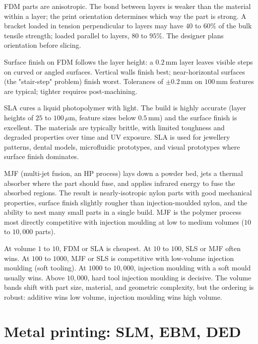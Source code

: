 FDM parts are anisotropic. The bond between layers is weaker than the material within a layer; the print orientation determines which way the part is strong. A bracket loaded in tension perpendicular to layers may have $40$ to $60\%$ of the bulk tensile strength; loaded parallel to layers, $80$ to $95\%$. The designer plans orientation before slicing.

Surface finish on FDM follows the layer height: a $0.2\,\text{mm}$ layer leaves visible steps on curved or angled surfaces. Vertical walls finish best; near-horizontal surfaces (the "stair-step" problem) finish worst. Tolerances of $\pm 0.2\,\text{mm}$ on $100\,\text{mm}$ features are typical; tighter requires post-machining.

SLA cures a liquid photopolymer with light. The build is highly accurate (layer heights of $25$ to $100\,\mu\text{m}$, feature sizes below $0.5\,\text{mm}$) and the surface finish is excellent. The materials are typically brittle, with limited toughness and degraded properties over time and UV exposure. SLA is used for jewellery patterns, dental models, microfluidic prototypes, and visual prototypes where surface finish dominates.

MJF (multi-jet fusion, an HP process) lays down a powder bed, jets a thermal absorber where the part should fuse, and applies infrared energy to fuse the absorbed regions. The result is nearly-isotropic nylon parts with good mechanical properties, surface finish slightly rougher than injection-moulded nylon, and the ability to nest many small parts in a single build. MJF is the polymer process most directly competitive with injection moulding at low to medium volumes ($10$ to $10{,}000$ parts).

\begin{archetype}
At volume $1$ to $10$, FDM or SLA is cheapest. At $10$ to $100$, SLS or MJF often wins. At $100$ to $1000$, MJF or SLS is competitive with low-volume injection moulding (soft tooling). At $1000$ to $10{,}000$, injection moulding with a soft mould usually wins. Above $10{,}000$, hard tool injection moulding is decisive. The volume bands shift with part size, material, and geometric complexity, but the ordering is robust: additive wins low volume, injection moulding wins high volume.
\end{archetype}

\section{Metal printing: SLM, EBM, DED}

